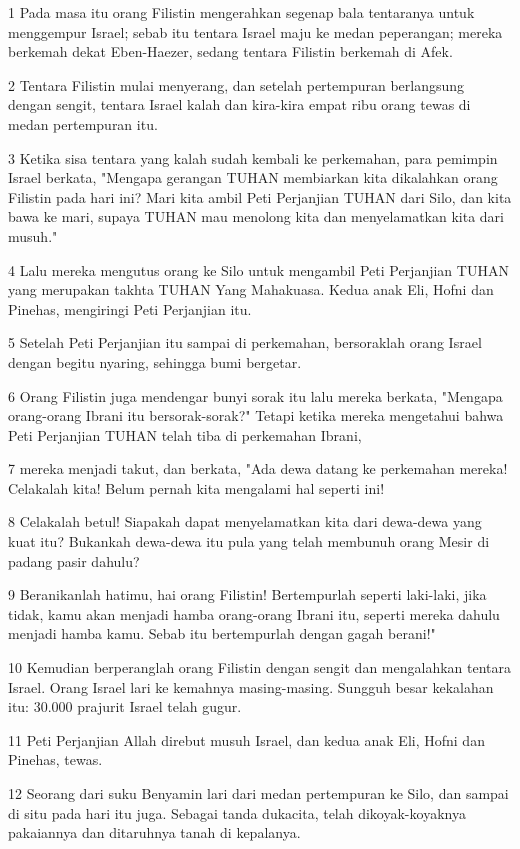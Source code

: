 \par 1 Pada masa itu orang Filistin mengerahkan segenap bala tentaranya untuk menggempur Israel; sebab itu tentara Israel maju ke medan peperangan; mereka berkemah dekat Eben-Haezer, sedang tentara Filistin berkemah di Afek.
\par 2 Tentara Filistin mulai menyerang, dan setelah pertempuran berlangsung dengan sengit, tentara Israel kalah dan kira-kira empat ribu orang tewas di medan pertempuran itu.
\par 3 Ketika sisa tentara yang kalah sudah kembali ke perkemahan, para pemimpin Israel berkata, "Mengapa gerangan TUHAN membiarkan kita dikalahkan orang Filistin pada hari ini? Mari kita ambil Peti Perjanjian TUHAN dari Silo, dan kita bawa ke mari, supaya TUHAN mau menolong kita dan menyelamatkan kita dari musuh."
\par 4 Lalu mereka mengutus orang ke Silo untuk mengambil Peti Perjanjian TUHAN yang merupakan takhta TUHAN Yang Mahakuasa. Kedua anak Eli, Hofni dan Pinehas, mengiringi Peti Perjanjian itu.
\par 5 Setelah Peti Perjanjian itu sampai di perkemahan, bersoraklah orang Israel dengan begitu nyaring, sehingga bumi bergetar.
\par 6 Orang Filistin juga mendengar bunyi sorak itu lalu mereka berkata, "Mengapa orang-orang Ibrani itu bersorak-sorak?" Tetapi ketika mereka mengetahui bahwa Peti Perjanjian TUHAN telah tiba di perkemahan Ibrani,
\par 7 mereka menjadi takut, dan berkata, "Ada dewa datang ke perkemahan mereka! Celakalah kita! Belum pernah kita mengalami hal seperti ini!
\par 8 Celakalah betul! Siapakah dapat menyelamatkan kita dari dewa-dewa yang kuat itu? Bukankah dewa-dewa itu pula yang telah membunuh orang Mesir di padang pasir dahulu?
\par 9 Beranikanlah hatimu, hai orang Filistin! Bertempurlah seperti laki-laki, jika tidak, kamu akan menjadi hamba orang-orang Ibrani itu, seperti mereka dahulu menjadi hamba kamu. Sebab itu bertempurlah dengan gagah berani!"
\par 10 Kemudian berperanglah orang Filistin dengan sengit dan mengalahkan tentara Israel. Orang Israel lari ke kemahnya masing-masing. Sungguh besar kekalahan itu: 30.000 prajurit Israel telah gugur.
\par 11 Peti Perjanjian Allah direbut musuh Israel, dan kedua anak Eli, Hofni dan Pinehas, tewas.
\par 12 Seorang dari suku Benyamin lari dari medan pertempuran ke Silo, dan sampai di situ pada hari itu juga. Sebagai tanda dukacita, telah dikoyak-koyaknya pakaiannya dan ditaruhnya tanah di kepalanya.
